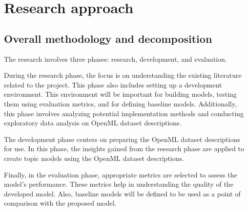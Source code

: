 \documentclass{article}
\begin{document}



\section{Research approach}
\label{sec:approach}
\subsection{Overall methodology and decomposition}

The research involves three phases: research, development, and evaluation.

During the research phase, the focus is on understanding the existing literature related to the project. This phase also includes setting up a development environment. This environment will be important for building models, testing them using evaluation metrics, and for defining baseline models. Additionally, this phase involves analyzing potential implementation methods and conducting exploratory data analysis on OpenML dataset descriptions.

The development phase centers on preparing the OpenML dataset descriptions for use. In this phase, the insights gained from the research phase are applied to create topic models using the OpenML dataset descriptions.

Finally, in the evaluation phase, appropriate metrics are selected to assess the model's performance. These metrics help in understanding the quality of the developed model. Also, baseline models will be defined to be used as a point of comparison with the proposed model.
\end{document}
